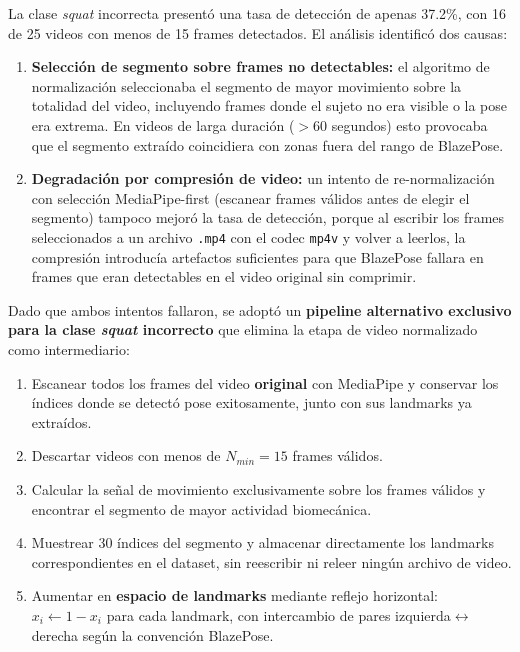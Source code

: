 \documentclass[conference]{IEEEtran}
\begin{document}
La clase \textit{squat} incorrecta presentó una tasa de detección
de apenas 37.2\%, con 16 de 25 videos con menos de 15 frames
detectados. El análisis identificó dos causas:

\begin{enumerate}
  \item \textbf{Selección de segmento sobre frames no detectables:}
        el algoritmo de normalización seleccionaba el segmento de
        mayor movimiento sobre la totalidad del video, incluyendo
        frames donde el sujeto no era visible o la pose era extrema.
        En videos de larga duración ($>$60 segundos) esto provocaba
        que el segmento extraído coincidiera con zonas fuera del
        rango de BlazePose.
  \item \textbf{Degradación por compresión de video:} un intento
        de re-normalización con selección MediaPipe-first (escanear
        frames válidos antes de elegir el segmento) tampoco mejoró
        la tasa de detección, porque al escribir los frames
        seleccionados a un archivo \texttt{.mp4} con el codec
        \texttt{mp4v} y volver a leerlos, la compresión introducía
        artefactos suficientes para que BlazePose fallara en frames
        que eran detectables en el video original sin comprimir.
\end{enumerate}

Dado que ambos intentos fallaron, se adoptó un \textbf{pipeline
alternativo exclusivo para la clase \textit{squat} incorrecto} que
elimina la etapa de video normalizado como intermediario:

\begin{enumerate}
  \item Escanear todos los frames del video \textbf{original} con
        MediaPipe y conservar los índices donde se detectó pose
        exitosamente, junto con sus landmarks ya extraídos.
  \item Descartar videos con menos de $N_{min} = 15$ frames
        válidos.
  \item Calcular la señal de movimiento exclusivamente sobre los
        frames válidos y encontrar el segmento de mayor actividad
        biomecánica.
  \item Muestrear 30 índices del segmento y almacenar directamente
        los landmarks correspondientes en el dataset, sin reescribir
        ni releer ningún archivo de video.
  \item Aumentar en \textbf{espacio de landmarks} mediante reflejo
        horizontal: $x_i \leftarrow 1 - x_i$ para cada landmark,
        con intercambio de pares izquierda$\leftrightarrow$derecha
        según la convención BlazePose.
\end{enumerate}
\end{document}
